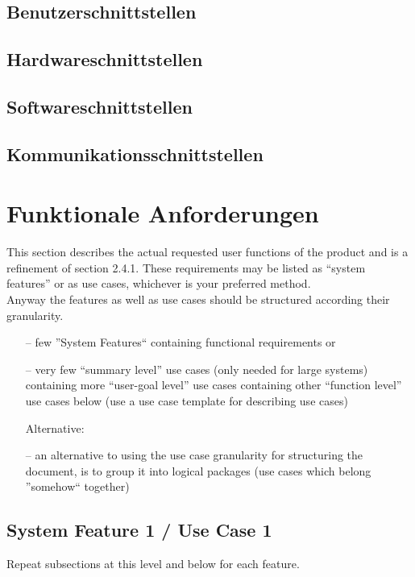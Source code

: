 \subsection{Benutzerschnittstellen}

\subsection{Hardwareschnittstellen}

\subsection{Softwareschnittstellen}

\subsection{Kommunikationsschnittstellen}

\newpage

\section{Funktionale Anforderungen}
This section describes the actual requested user functions of the product and is a refinement of section 2.4.1. These requirements may be listed as “system features” or as use cases, whichever is your preferred method. \\[-0.3cm]

\noindent Anyway the features as well as use cases should be structured according their granularity.
\begin{itemize}
	\item[--] few ''System Features`` containing functional requirements or
	\item[--] very few “summary level” use cases (only needed for large systems) containing more “user-goal level” use cases containing other “function level” use cases below (use a use case template for describing use cases)
	\item[] Alternative:
	\item[--] an alternative to using the use case granularity for structuring the document, is to group it into logical packages (use cases which belong ''somehow`` together)
\end{itemize}

\subsection{System Feature 1 / Use Case 1}
Repeat subsections at this level and below for each feature. \\[-0.3cm]

